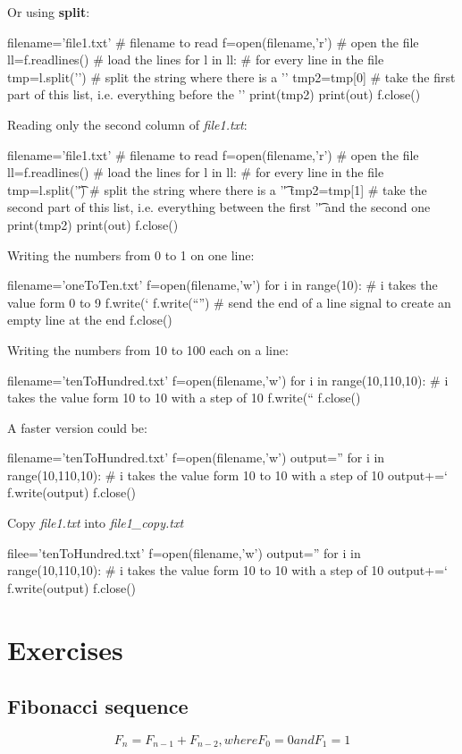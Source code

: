 \documentclass[article,10pt]{scrartcl}
\begin{document}
Or using \textbf{split}:\\
\begin{python}
filename='file1.txt' # filename to read
f=open(filename,'r') # open the file
ll=f.readlines() # load the lines
for l in ll: # for every line in the file
   tmp=l.split('\n') #  split the string where there is a '\n'
   tmp2=tmp[0] # take the first part of this list, i.e. everything before the '\n'
   print(tmp2)
print(out)
f.close()
\end{python}
Reading only the second column of \textit{file1.txt}:
\label{ex2}
\begin{python}
filename='file1.txt' # filename to read
f=open(filename,'r') # open the file
ll=f.readlines() # load the lines
for l in ll: # for every line in the file
   tmp=l.split('\t') #  split the string where there is a '\t'
   tmp2=tmp[1] # take the second part of this list, i.e. everything between the first '\t' and the second one
   print(tmp2)
print(out)
f.close()
\end{python}
Writing the numbers from 0 to 1 on one line:
\begin{python}
filename='oneToTen.txt' 
f=open(filename,'w')
for i in range(10): # i takes the value form 0 to 9
   f.write(`%
f.write(``\n'') # send the end of a line signal to create an empty line at the end
f.close()
\end{python}
Writing the numbers from 10 to 100 each on a line:
\begin{python}
filename='tenToHundred.txt'
f=open(filename,'w')
for i in range(10,110,10): # i takes the value form 10 to 10 with a step of 10
   f.write(``%
f.close()
\end{python}
A faster version could be:
\begin{python}
filename='tenToHundred.txt'
f=open(filename,'w')
output=''
for i in range(10,110,10): # i takes the value form 10 to 10 with a step of 10
   output+=`%
f.write(output)
f.close()
\end{python}

Copy \textit{file1.txt} into \textit{file1\_copy.txt}
\begin{python}
filee='tenToHundred.txt'
f=open(filename,'w')
output=''
for i in range(10,110,10): # i takes the value form 10 to 10 with a step of 10
   output+=`%
f.write(output)
f.close()
\end{python}


\newpage{}
\section{Exercises}
\subsection{Fibonacci sequence}

\begin{equation}
F_n = F_{n-1}+F_{n-2}, where F_0 = 0 and F_1 = 1
\end{equation}
\end{document}
